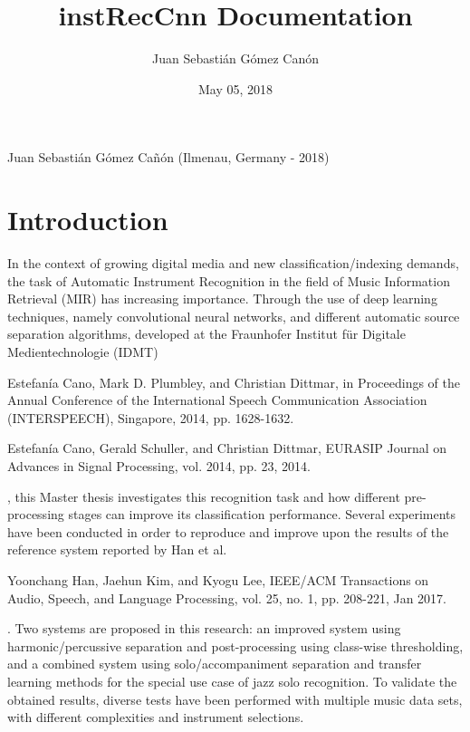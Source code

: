 \documentclass[letterpaper,10pt,english]{sphinxmanual}
\title{instRecCnn Documentation}
\date{May 05, 2018}
\author{Juan Sebastián Gómez Canón}
\begin{document}
\maketitle
\sphinxtableofcontents
{}\label{\detokenize{index::doc}}


Juan Sebastián Gómez Cañón (Ilmenau, Germany - 2018)


\chapter{Introduction}
\label{\detokenize{index:introduction}}\label{\detokenize{index:automatic-instrument-recognition-with-deep-convolutional-neural-networks}}
In the context of growing digital media and new classification/indexing demands, the
task of Automatic Instrument Recognition in the field of Music Information Retrieval
(MIR) has increasing importance. Through the use of deep learning techniques, namely
convolutional neural networks, and different automatic source separation algorithms,
developed at the Fraunhofer Institut für Digitale Medientechnologie (IDMT) %
\begin{footnote}[1]\sphinxAtStartFootnote
Estefanía Cano, Mark D. Plumbley, and Christian Dittmar,  in Proceedings of the Annual Conference of the International Speech Communication Association (INTERSPEECH), Singapore, 2014, pp. 1628-1632.
%
\end{footnote} %
\begin{footnote}[2]\sphinxAtStartFootnote
Estefanía Cano, Gerald Schuller, and Christian Dittmar,  EURASIP Journal on Advances in Signal Processing, vol. 2014, pp. 23, 2014.
%
\end{footnote}, this
Master thesis investigates this recognition task and how different pre-processing stages
can improve its classification performance. Several experiments have been conducted
in order to reproduce and improve upon the results of the reference system reported
by Han et al. %
\begin{footnote}[3]\sphinxAtStartFootnote
Yoonchang Han, Jaehun Kim, and Kyogu Lee,  IEEE/ACM Transactions on Audio, Speech, and Language Processing, vol. 25, no. 1, pp. 208-221, Jan 2017.
%
\end{footnote} . Two systems are proposed in this research: an improved system using
harmonic/percussive separation and post-processing using class-wise thresholding,
and a combined system using solo/accompaniment separation and transfer learning
methods for the special use case of jazz solo recognition. To validate the obtained
results, diverse tests have been performed with multiple music data sets, with different
complexities and instrument selections.
\end{document}
